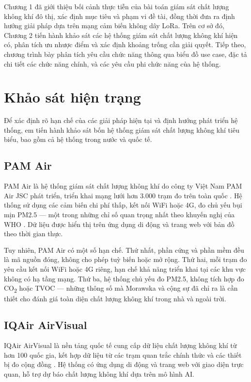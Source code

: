 \documentclass[../DoAn.tex]{subfiles}
\begin{document}
Chương 1 đã giới thiệu bối cảnh thực tiễn của bài toán giám sát chất lượng không khí đô thị, xác định mục tiêu và phạm vi đề tài, đồng thời đưa ra định hướng giải pháp dựa trên mạng cảm biến không dây LoRa. Trên cơ sở đó, Chương 2 tiến hành khảo sát các hệ thống giám sát chất lượng không khí hiện có, phân tích ưu nhược điểm và xác định khoảng trống cần giải quyết. Tiếp theo, chương trình bày phân tích yêu cầu chức năng thông qua biểu đồ use case, đặc tả chi tiết các chức năng chính, và các yêu cầu phi chức năng của hệ thống.

\section{Khảo sát hiện trạng}
\label{section:2.1}

Để xác định rõ hạn chế của các giải pháp hiện tại và định hướng phát triển hệ thống, em tiến hành khảo sát bốn hệ thống giám sát chất lượng không khí tiêu biểu, bao gồm cả hệ thống trong nước và quốc tế.

\subsection{PAM Air}
\label{subsection:2.1.1}

PAM Air là hệ thống giám sát chất lượng không khí do công ty Việt Nam PAM Air JSC phát triển, triển khai mạng lưới hơn 3.000 trạm đo trên toàn quốc \cite{pamair2024}. Hệ thống sử dụng các cảm biến chi phí thấp, kết nối WiFi hoặc 4G, đo chủ yếu bụi mịn PM2.5 — một trong những chỉ số quan trọng nhất theo khuyến nghị của WHO \cite{who2021}. Dữ liệu được hiển thị trên ứng dụng di động và trang web với bản đồ theo thời gian thực.

Tuy nhiên, PAM Air có một số hạn chế. Thứ nhất, phần cứng và phần mềm đều là mã nguồn đóng, không cho phép tuỳ biến hoặc mở rộng. Thứ hai, mỗi trạm đo yêu cầu kết nối WiFi hoặc 4G riêng, hạn chế khả năng triển khai tại các khu vực không có hạ tầng mạng. Thứ ba, hệ thống chủ yếu đo PM2.5, không tích hợp đo CO\textsubscript{2} hoặc TVOC — những thông số mà Morawska và cộng sự \cite{morawska2018} đã chỉ ra là cần thiết cho đánh giá toàn diện chất lượng không khí trong nhà và ngoài trời.

\subsection{IQAir AirVisual}
\label{subsection:2.1.2}

IQAir AirVisual là nền tảng quốc tế cung cấp dữ liệu chất lượng không khí từ hơn 100 quốc gia, kết hợp dữ liệu từ các trạm quan trắc chính thức và các thiết bị đo cộng đồng \cite{iqair2024}. Hệ thống có ứng dụng di động và trang web với giao diện trực quan, hỗ trợ dự báo chất lượng không khí dựa trên mô hình AI.
\end{document}

